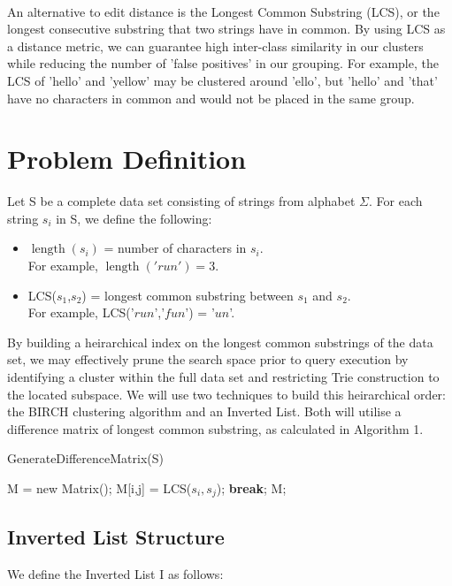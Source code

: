 \documentclass[pdftex,12pt,letter]{article}
\DeclareMathOperator{\length}{length}
\begin{document}
\\
An alternative to edit distance is the Longest Common Substring (LCS), or the longest consecutive substring that two strings have in common. By using LCS as a distance metric, we can guarantee high inter-class similarity in our clusters while reducing the number of 'false positives' in our grouping. For example, the LCS of 'hello' and 'yellow' may be clustered around 'ello', but 'hello' and 'that' have no characters in common and would not be placed in the same group. 

\section{Problem Definition}
Let S be a complete data set consisting of strings from alphabet $\Sigma$. For each string $s_i$ in S, we define the following:
\begin{itemize}
\item $\length(s_i)$ = number of characters in $s_i$.\\ For example, $\length('run') = 3$.
\item LCS($s_1$,$s_2$) = longest common substring between $s_1$ and $s_2$.\\ For example, LCS('$run$','$fun$') = '$un$'.
\end{itemize}

By building a heirarchical index on the longest common substrings of the data set, we may effectively prune the search space prior to query execution by identifying a cluster within the full data set and restricting Trie construction to the located subspace. We will use two techniques to build this heirarchical order: the BIRCH clustering algorithm and an Inverted List. Both will utilise a difference matrix of longest common substring, as calculated in Algorithm 1.

\begin{algorithm}
\caption{GenerateDifferenceMatrix(S)}
\label{Algorithm 1}
\begin{algorithmic}[1]
\STATE M = new Matrix();
\STATE M[i,j] = LCS($s_i, s_j$);
\STATE \textbf{break};
\ENDIF
\ENDFOR
\ENDFOR
\RETURN M;
\end{algorithmic}
\end{algorithm}

\subsection{Inverted List Structure}
We define the Inverted List I as follows:
\end{document}
